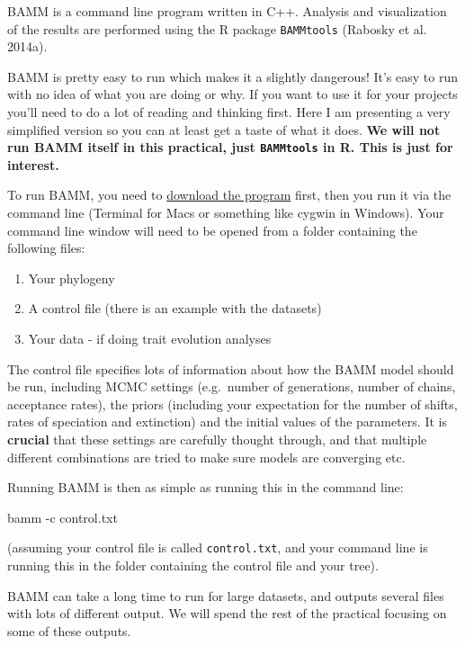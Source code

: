 \documentclass[]{book}
\newenvironment{Shaded}{\begin{snugshade}}{\end{snugshade}}
\newcommand{\NormalTok}[1]{{#1}}
\providecommand{\tightlist}{%
  \setlength{\itemsep}{0pt}\setlength{\parskip}{0pt}}
\begin{document}
BAMM is a command line program written in C++. Analysis and
visualization of the results are performed using the R package
\texttt{BAMMtools} (Rabosky et al. 2014a).

BAMM is pretty easy to run which makes it a slightly dangerous! It's
easy to run with no idea of what you are doing or why. If you want to
use it for your projects you'll need to do a lot of reading and thinking
first. Here I am presenting a very simplified version so you can at
least get a taste of what it does. \textbf{We will not run BAMM itself
in this practical, just \texttt{BAMMtools} in R. This is just for
interest.}

To run BAMM, you need to
\href{http://bamm-project.org/download.html}{download the program}
first, then you run it via the command line (Terminal for Macs or
something like cygwin in Windows). Your command line window will need to
be opened from a folder containing the following files:

\begin{enumerate}
\def\labelenumi{\arabic{enumi}.}
\tightlist
\item
  Your phylogeny
\item
  A control file (there is an example with the datasets)
\item
  Your data - if doing trait evolution analyses
\end{enumerate}

The control file specifies lots of information about how the BAMM model
should be run, including MCMC settings (e.g.~number of generations,
number of chains, acceptance rates), the priors (including your
expectation for the number of shifts, rates of speciation and
extinction) and the initial values of the parameters. It is
\textbf{crucial} that these settings are carefully thought through, and
that multiple different combinations are tried to make sure models are
converging etc.

Running BAMM is then as simple as running this in the command line:

\begin{Shaded}
\begin{Highlighting}[]
\NormalTok{bamm -c control.txt}
\end{Highlighting}
\end{Shaded}

(assuming your control file is called \texttt{control.txt}, and your
command line is running this in the folder containing the control file
and your tree).

BAMM can take a long time to run for large datasets, and outputs several
files with lots of different output. We will spend the rest of the
practical focusing on some of these outputs.
\end{document}
